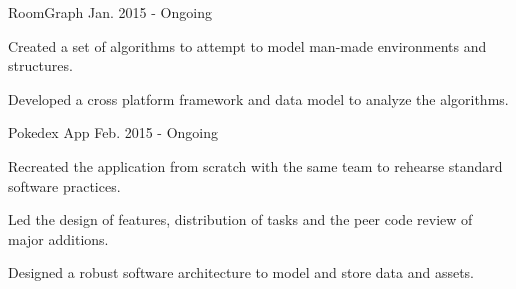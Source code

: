 

\begin{cventries}

  \vspace{1.5mm} %
  \cventry
    {RoomGraph} %
    {} %
    {} %
    {Jan. 2015 - Ongoing} %
    {
      \begin{cvitems} %
        \item {Created a set of algorithms to attempt to model man-made environments and structures.}
        \item {Developed a cross platform framework and data model to analyze the algorithms.}
        \\
      \end{cvitems}
    }

  \cventry
    {Pokedex App} %
    {} %
    {} %
    {Feb. 2015 - Ongoing} %
    {
      \begin{cvitems} %
        \item {Recreated the application from scratch with the same team to rehearse standard software practices.}
        \item {Led the design of features, distribution of tasks and the peer code review of major additions.}
        \item {Designed a robust software architecture to model and store data and assets.}
        \\
      \end{cvitems}
    } 
    

\end{cventries}
